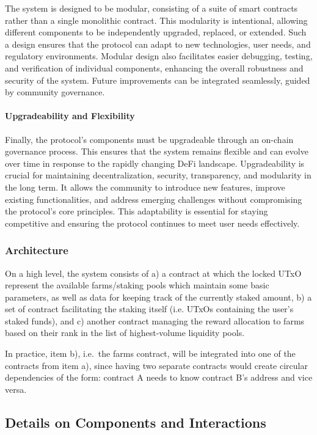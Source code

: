 \documentclass[12pt,parskip=full, tikz]{article}
\begin{document}
The system is designed to be modular, consisting of a suite of smart contracts rather than a single monolithic contract. This modularity is intentional, allowing different components to be independently upgraded, replaced, or extended. Such a design ensures that the protocol can adapt to new technologies, user needs, and regulatory environments. Modular design also facilitates easier debugging, testing, and verification of individual components, enhancing the overall robustness and security of the system. Future improvements can be integrated seamlessly, guided by community governance.

\paragraph{Upgradeability and Flexibility}

Finally, the protocol's components must be upgradeable through an on-chain governance process. This ensures that the system remains flexible and can evolve over time in response to the rapidly changing DeFi landscape. Upgradeability is crucial for maintaining decentralization, security, transparency, and modularity in the long term. It allows the community to introduce new features, improve existing functionalities, and address emerging challenges without compromising the protocol's core principles. This adaptability is essential for staying competitive and ensuring the protocol continues to meet user needs effectively.


\subsubsection{Architecture}
On a high level, the system consists of a) a contract at which the locked UTxO represent the available farms/staking pools which maintain some basic parameters, as well as data for keeping track of the currently staked amount, b) a set of contract facilitating the staking itself (i.e. UTxOs containing the user's staked funds), and c) another contract managing the reward allocation to farms based on their rank in the list of highest-volume liquidity pools.

In practice, item b), i.e.\ the farms contract, will be integrated into one of the contracts from item a), since having two separate contracts would create circular dependencies of the form: contract A needs to know contract B's address and vice versa.

\subsection{Details on Components and Interactions}
\end{document}
